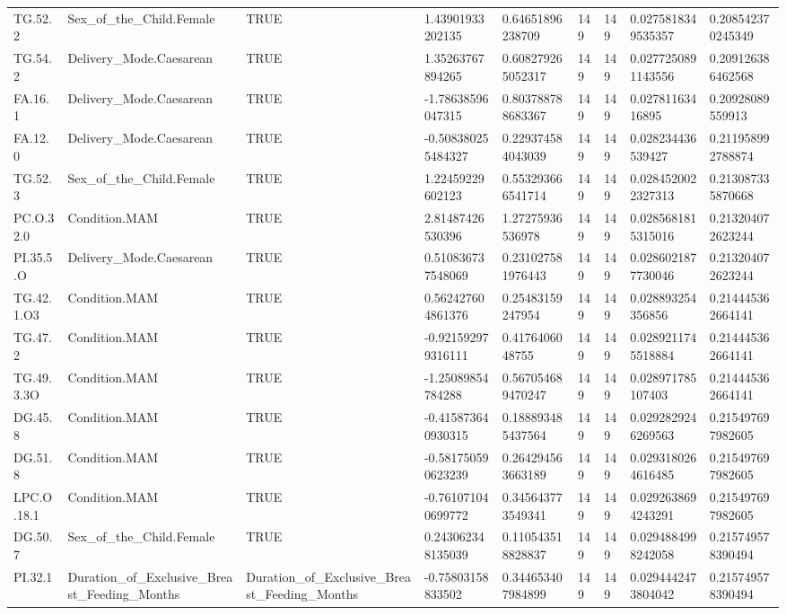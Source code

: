 \begin{longtable}{lllllllll}
TG.52.2 & Sex\_of\_the\_Child.Female & TRUE & 1.43901933202135 & 0.64651896238709 & 149 & 149 & 0.0275818349535357 & 0.208542370245349 \\
TG.54.2 & Delivery\_Mode.Caesarean & TRUE & 1.35263767894265 & 0.608279265052317 & 149 & 149 & 0.0277250891143556 & 0.209126386462568 \\
FA.16.1 & Delivery\_Mode.Caesarean & TRUE & -1.78638596047315 & 0.803788788683367 & 149 & 149 & 0.02781163416895 & 0.20928089559913 \\
FA.12.0 & Delivery\_Mode.Caesarean & TRUE & -0.508380255484327 & 0.229374584043039 & 149 & 149 & 0.028234436539427 & 0.211958992788874 \\
TG.52.3 & Sex\_of\_the\_Child.Female & TRUE & 1.22459229602123 & 0.553293666541714 & 149 & 149 & 0.0284520022327313 & 0.213087335870668 \\
PC.O.32.0 & Condition.MAM & TRUE & 2.81487426530396 & 1.27275936536978 & 149 & 149 & 0.0285681815315016 & 0.213204072623244 \\
PI.35.5.O & Delivery\_Mode.Caesarean & TRUE & 0.510836737548069 & 0.231027581976443 & 149 & 149 & 0.0286021877730046 & 0.213204072623244 \\
TG.42.1.O3 & Condition.MAM & TRUE & 0.562427604861376 & 0.25483159247954 & 149 & 149 & 0.028893254356856 & 0.214445362664141 \\
TG.47.2 & Condition.MAM & TRUE & -0.921592979316111 & 0.4176406048755 & 149 & 149 & 0.0289211745518884 & 0.214445362664141 \\
TG.49.3.3O & Condition.MAM & TRUE & -1.25089854784288 & 0.567054689470247 & 149 & 149 & 0.028971785107403 & 0.214445362664141 \\
DG.45.8 & Condition.MAM & TRUE & -0.415873640930315 & 0.188893485437564 & 149 & 149 & 0.0292829246269563 & 0.215497697982605 \\
DG.51.8 & Condition.MAM & TRUE & -0.581750590623239 & 0.264294563663189 & 149 & 149 & 0.0293180264616485 & 0.215497697982605 \\
LPC.O.18.1 & Condition.MAM & TRUE & -0.761071040699772 & 0.345643773549341 & 149 & 149 & 0.0292638694243291 & 0.215497697982605 \\
DG.50.7 & Sex\_of\_the\_Child.Female & TRUE & 0.243062348135039 & 0.110543518828837 & 149 & 149 & 0.0294884998242058 & 0.215749578390494 \\
PI.32.1 & Duration\_of\_Exclusive\_Breast\_Feeding\_Months & Duration\_of\_Exclusive\_Breast\_Feeding\_Months & -0.75803158833502 & 0.344653407984899 & 149 & 149 & 0.0294442473804042 & 0.215749578390494 \\

\end{longtable}
